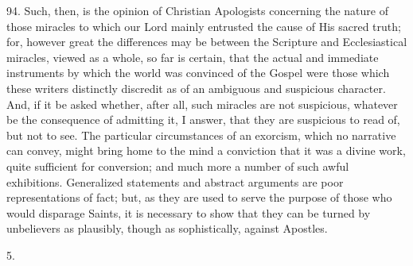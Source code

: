 94.
Such, then, is the opinion of Christian Apologists concerning the
nature of those miracles to which our Lord mainly entrusted the cause
of His sacred truth; for, however great the differences may be between
the Scripture and Ecclesiastical miracles, viewed as a whole, so far
is certain, that the actual and immediate instruments by which the
world was convinced of the Gospel were those which these writers
distinctly discredit as of an ambiguous and suspicious character. And,
if it be asked whether, after all, such miracles are not suspicious,
whatever be the consequence of admitting it, I answer, that they are
suspicious to read of, but not to see. The particular circumstances of
an exorcism, which no narrative can convey, might bring home to the
mind a conviction that it was a divine work, quite sufficient for
conversion; and much more a number of such awful exhibitions.
Generalized statements and abstract arguments are poor representations
of fact; but, as they are used to serve the purpose of those who
would disparage Saints, it is necessary to show that they can be
turned by unbelievers as plausibly, though as sophistically, against
Apostles.

5.


